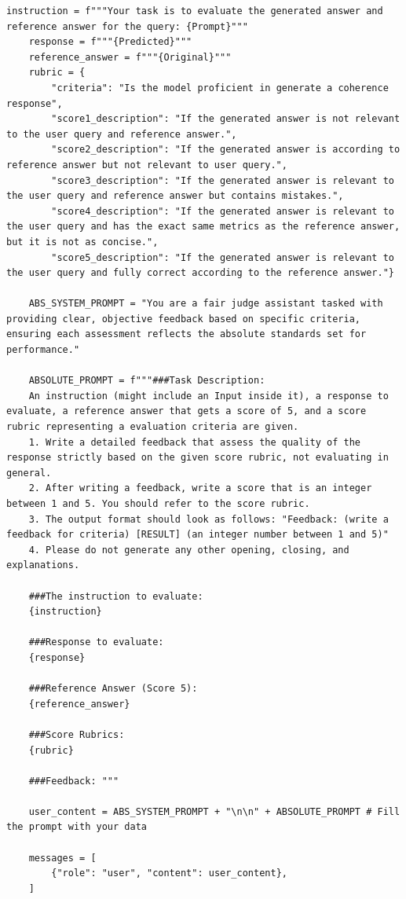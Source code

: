 \begin{lstlisting}[style=python, frame = single, caption=Prompt estructured correctness, label=code:estructured-correctness]
    instruction = f"""Your task is to evaluate the generated answer and reference answer for the query: {Prompt}"""
    response = f"""{Predicted}""" 
    reference_answer = f"""{Original}"""
    rubric = {
        "criteria": "Is the model proficient in generate a coherence response",
        "score1_description": "If the generated answer is not relevant to the user query and reference answer.",
        "score2_description": "If the generated answer is according to reference answer but not relevant to user query.",
        "score3_description": "If the generated answer is relevant to the user query and reference answer but contains mistakes.",
        "score4_description": "If the generated answer is relevant to the user query and has the exact same metrics as the reference answer, but it is not as concise.",
        "score5_description": "If the generated answer is relevant to the user query and fully correct according to the reference answer."}

    ABS_SYSTEM_PROMPT = "You are a fair judge assistant tasked with providing clear, objective feedback based on specific criteria, ensuring each assessment reflects the absolute standards set for performance."

    ABSOLUTE_PROMPT = f"""###Task Description:
    An instruction (might include an Input inside it), a response to evaluate, a reference answer that gets a score of 5, and a score rubric representing a evaluation criteria are given.
    1. Write a detailed feedback that assess the quality of the response strictly based on the given score rubric, not evaluating in general.
    2. After writing a feedback, write a score that is an integer between 1 and 5. You should refer to the score rubric.
    3. The output format should look as follows: "Feedback: (write a feedback for criteria) [RESULT] (an integer number between 1 and 5)"
    4. Please do not generate any other opening, closing, and explanations.

    ###The instruction to evaluate:
    {instruction}

    ###Response to evaluate:
    {response}

    ###Reference Answer (Score 5):
    {reference_answer}

    ###Score Rubrics:
    {rubric}

    ###Feedback: """

    user_content = ABS_SYSTEM_PROMPT + "\n\n" + ABSOLUTE_PROMPT # Fill the prompt with your data

    messages = [
        {"role": "user", "content": user_content},
    ]
\end{lstlisting}

